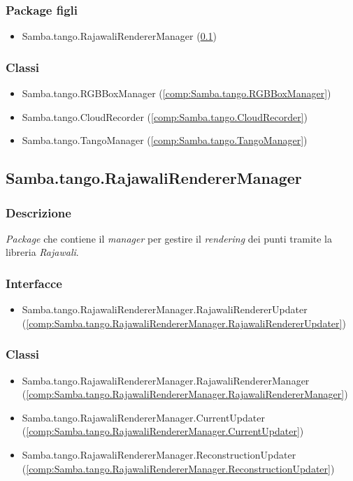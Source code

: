\subsubsection{Package figli}
\begin{itemize}
	\item Samba.tango.RajawaliRendererManager (\ref{comp:Samba.tango.RajawaliRendererManager})
\end{itemize}
\subsubsection{Classi}
\begin{itemize}
	\item Samba.tango.RGBBoxManager (\ref{comp:Samba.tango.RGBBoxManager})
	\item Samba.tango.CloudRecorder (\ref{comp:Samba.tango.CloudRecorder})
	\item Samba.tango.TangoManager (\ref{comp:Samba.tango.TangoManager})
\end{itemize}

\subsection{Samba.tango.RajawaliRendererManager}\label{comp:Samba.tango.RajawaliRendererManager}
\subsubsection{Descrizione}
\emph{Package} che contiene il \emph{manager} per gestire il \emph{rendering} dei punti tramite la libreria \emph{Rajawali}.
\subsubsection{Interfacce}
\begin{itemize}
	\item Samba.tango.RajawaliRendererManager.RajawaliRendererUpdater (\ref{comp:Samba.tango.RajawaliRendererManager.RajawaliRendererUpdater})
\end{itemize}
\subsubsection{Classi}
\begin{itemize}
	\item Samba.tango.RajawaliRendererManager.RajawaliRendererManager (\ref{comp:Samba.tango.RajawaliRendererManager.RajawaliRendererManager})
	\item Samba.tango.RajawaliRendererManager.CurrentUpdater (\ref{comp:Samba.tango.RajawaliRendererManager.CurrentUpdater})
	\item Samba.tango.RajawaliRendererManager.ReconstructionUpdater (\ref{comp:Samba.tango.RajawaliRendererManager.ReconstructionUpdater})
\end{itemize}


